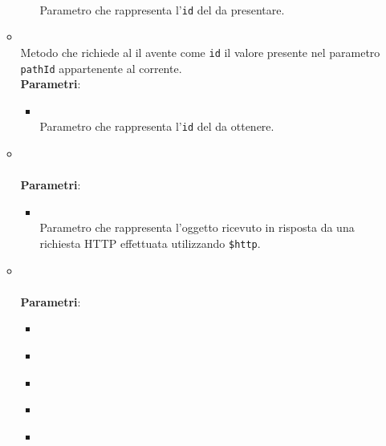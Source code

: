 \begin{itemize}
\begin{itemize}
\begin{itemize}
\\ Parametro che rappresenta l'\texttt{id} del  da presentare.
\end{itemize}
\item {}
\\ Metodo che richiede al  il  avente come \texttt{id} il valore presente nel parametro \texttt{pathId} appartenente al  corrente.
\\ \textbf{Parametri}:
\begin{itemize}
\item {}
\\ Parametro che rappresenta l'\texttt{id} del  da ottenere.
\end{itemize}
\item {}
\\ \dpHandleError
\\ \textbf{Parametri}:
\begin{itemize}
\item {}
\\ Parametro che rappresenta l'oggetto ricevuto in risposta da una richiesta HTTP effettuata utilizzando \texttt{\$http}.
\end{itemize}
\item {}
\\ \dpConstructor
\\ \textbf{Parametri}:
\begin{itemize}
\item {}
\\ \dpHttpParam
\item {}
\\ \dpQParam
\item {}
\\ \dpConstantServiceParam
\item {}
\\ \dpProjectServiceParam
\item {}
\\ \dpPathServiceParam
\end{itemize}
\end{itemize}
\end{itemize}
